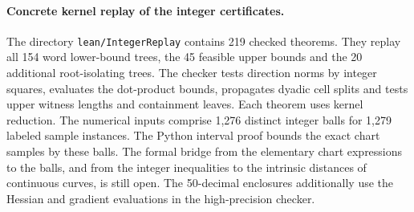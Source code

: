 \paragraph{Concrete kernel replay of the integer certificates.}
The directory \texttt{lean/IntegerReplay} contains 219 checked theorems. They replay all 154 word lower-bound trees, the 45 feasible upper bounds and the 20 additional root-isolating trees. The checker tests direction norms by integer squares, evaluates the dot-product bounds, propagates dyadic cell splits and tests upper witness lengths and containment leaves. Each theorem uses kernel reduction. The numerical inputs comprise 1,276 distinct integer balls for 1,279 labeled sample instances. The Python interval proof bounds the exact chart samples by these balls. The formal bridge from the elementary chart expressions to the balls, and from the integer inequalities to the intrinsic distances of continuous curves, is still open. The 50-decimal enclosures additionally use the Hessian and gradient evaluations in the high-precision checker.
